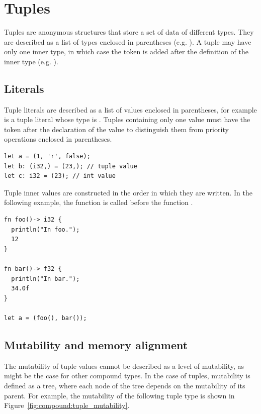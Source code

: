 \section{Tuples}
\label{sec:compound:tuples}

Tuples are anonymous structures that store a set of data of different types.
They are described as a list of types enclosed in parentheses (e.g.
). A tuple may have only one inner type, in which case
the token \token{,} is added after the definition of the inner type (e.g.
).

\subsection{Literals}

Tuple literals are described as a list of values enclosed in parentheses, for
example  is a tuple literal whose type is . Tuples containing only one value must have the token \token{,}
after the declaration of the value to distinguish them from priority operations
enclosed in parentheses.

\begin{lstlisting}[style=coloredverbatim]
let a = (1, 'r', false);
let b: (i32,) = (23,); // tuple value
let c: i32 = (23); // int value
\end{lstlisting}

\noindent Tuple inner values are constructed in the order in which they are
written. In the following example, the function  is called before
the function .

\begin{lstlisting}[style=coloredverbatim]
fn foo()-> i32 {
  println("In foo.");
  12
}

fn bar()-> f32 {
  println("In bar.");
  34.0f
}

let a = (foo(), bar());
\end{lstlisting}

\subsection{Mutability and memory alignment}%
\label{sec:compound:tuple_mutability}

The mutability of tuple values cannot be described as a level of mutability, as
might be the case for other compound types. In the case of tuples, mutability is
defined as a tree, where each node of the tree depends on the mutability of its
parent. For example, the mutability of the following tuple type  is shown in Figure~\ref{fig:compound:tuple_mutability}.

